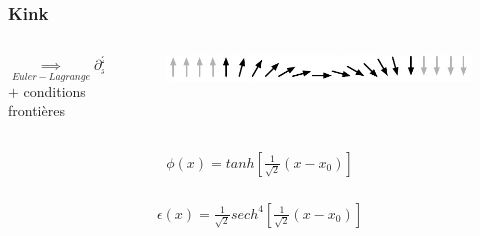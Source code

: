 \documentclass[handout]{beamer}
\begin{document}
%

\begin{frame}\frametitle{Kink}
\begin{columns}[T]
    \begin{column}[T]{.5\linewidth}
       $\underset{Euler-Lagrange}{\implies} \partial_x^2\phi = \phi^3 -  \phi$  \\[0.25 cm]$+$ conditions frontières
    \end{column}
    \begin{column}[T]{.5\linewidth}
\begin{figure}
\includegraphics[scale=0.28]{kink_spin.png}
\end{figure}
    \end{column}
  \end{columns}

\begin{columns}[T]

 \begin{column}[T]{.6\linewidth}

 \begin{block}{}

\begin{align*}
\phi(x) = tanh\left[\frac{1}{\sqrt{2}}(x-x_0)\right] \\
\end{align*}
 \end{block}
 
 \begin{exampleblock}{}
   
\begin{align*}
\epsilon(x)= \frac{1}{\sqrt{2}}sech^4\left[\frac{1}{\sqrt{2}}(x-x_0)\right]
\end{align*}
 \end{exampleblock}


\end{column}
\end{columns}
\end{frame}
\end{document}
